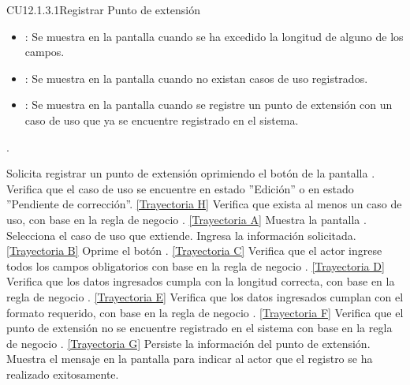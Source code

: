 \begin{UseCase}{CU12.1.3.1}{Registrar Punto de extensión}
{\begin{itemize}
		\item {}: Se muestra en la pantalla  cuando se ha excedido la longitud de alguno de los campos.
		\item {}: Se muestra en la pantalla  cuando no existan casos de uso registrados.
		\item {}: Se muestra en la pantalla  cuando se registre un punto de extensión con un caso de uso que ya se encuentre registrado en el sistema.
		\end{itemize}.
		}
	\end{UseCase}
	\begin{UCtrayectoria}
		\UCpaso[\UCactor] Solicita registrar un punto de extensión oprimiendo el botón  de la pantalla .
		\UCpaso[\UCactor] Verifica que el caso de uso se encuentre en estado ''Edición'' o en estado ''Pendiente de corrección''. \hyperlink{CU12-1-6-1:TAH}{[Trayectoria H]}
		\UCpaso[\UCsist] Verifica que exista al menos un caso de uso, con base en la regla de negocio . \hyperlink{CU12-1-6-1:TAA}{[Trayectoria A]}
		\UCpaso[\UCsist] Muestra la pantalla .
		\UCpaso[\UCactor] Selecciona el caso de uso que extiende. 
		\UCpaso[\UCsist] Ingresa la información solicitada. \hyperlink{CU12-1-6-1:TAB}{[Trayectoria B]} \label{CU12.1.6.1-P4}
		\UCpaso[\UCactor] Oprime el botón . \hyperlink{CU12-1-6-1:TAC}{[Trayectoria C]}\label{CU12.1.6.1-P6}
		\UCpaso[\UCsist] Verifica que el actor ingrese todos los campos obligatorios con base en la regla de negocio . \hyperlink{CU12-1-6-1:TAD}{[Trayectoria D]}
		\UCpaso[\UCsist] Verifica que los datos ingresados cumpla con la longitud correcta, con base en la regla de negocio . \hyperlink{CU12-1-6-1:TAE}{[Trayectoria E]}
		\UCpaso[\UCsist] Verifica que los datos ingresados cumplan con el formato requerido, con base en la regla de negocio . \hyperlink{CU12-1-6-1:TAF}{[Trayectoria F]}
		\UCpaso[\UCsist] Verifica que el punto de extensión no se encuentre registrado en el sistema con base en la regla de negocio . \hyperlink{CU12-1-6-1:TAG}{[Trayectoria G]}
		\UCpaso[\UCsist] Persiste la información del punto de extensión.
		\UCpaso[\UCsist] Muestra el mensaje  en la pantalla  para indicar al actor que el registro se ha realizado exitosamente.
	\end{UCtrayectoria}		
